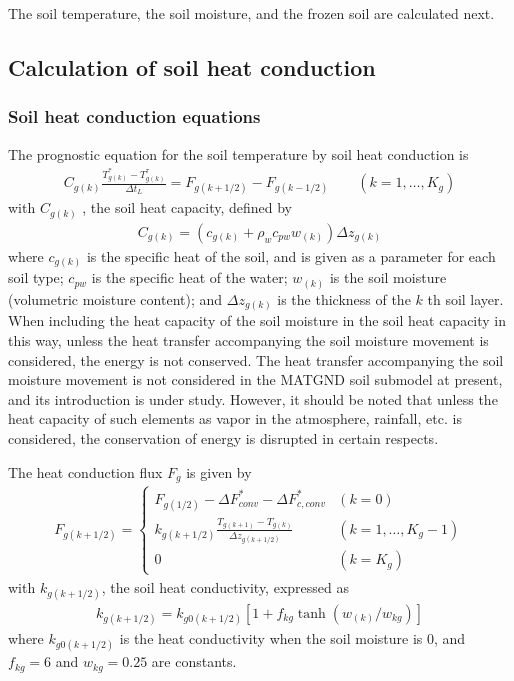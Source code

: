 The soil temperature, the soil moisture, and the frozen soil are calculated next.

\subsection{Calculation of soil heat conduction}\label{calculation-of-soil-heat-conduction}

\subsubsection{Soil heat conduction equations}\label{soil-heat-conduction-equations}

The prognostic equation for the soil temperature by soil heat conduction is \begin{eqnarray}
C_{g(k)} \frac{T_{g(k)}^\ast - T_{g(k)}^{\tau}}{\Delta t_L} = F_{g(k+1/2)} - F_{g(k-1/2)}
\qquad (k=1,\ldots,K_{g}) \label{eq289}
\end{eqnarray} with \(C_{g(k)}\) , the soil heat capacity, defined by \begin{eqnarray}
 C_{g(k)} = ( c_{g(k)} + \rho_w c_{pw} w_{(k)} ) \Delta z_{g(k)}
\end{eqnarray} where \(c_{g(k)}\) is the specific heat of the soil, and is given as a parameter for each soil type; \(c_{pw}\) is the specific heat of the water; \(w_{(k)}\) is the soil moisture (volumetric
moisture content); and \(\Delta z_{g(k)}\) is the thickness of the \(k\) th soil layer. When including the heat capacity of the soil moisture in the soil heat capacity in this way, unless the heat
transfer accompanying the soil moisture movement is considered, the energy is not conserved. The heat transfer accompanying the soil moisture movement is not considered in the MATGND soil submodel at
present, and its introduction is under study. However, it should be noted that unless the heat capacity of such elements as vapor in the atmosphere, rainfall, etc. is considered, the conservation of
energy is disrupted in certain respects.

The heat conduction flux \(F_{g}\) is given by \begin{eqnarray}
 F_{g(k+1/2)} =
\left\{
\begin{array}{ll}
F_{g(1/2)} - \Delta F_{conv}^\ast - \Delta F_{c,conv}^\ast
 & (k=0)\\
\displaystyle{
k_{g(k+1/2)} \frac{T_{g(k+1)} - T_{g(k)}}{\Delta z_{g(k+1/2)}}
}
 & (k=1,\ldots,K_{g}-1) \\
\displaystyle{
0
}
 & (k=K_{g})
\end{array}
\right. \label{eq291}
\end{eqnarray} with \(k_{g(k+1/2)}\), the soil heat conductivity, expressed as \begin{eqnarray}
 k_{g(k+1/2)} = k_{g0(k+1/2)} [ 1 + f_{kg} \tanh( w_{(k)}/ w_{kg} ) ]
\end{eqnarray} where \(k_{g0(k+1/2)}\) is the heat conductivity when the soil moisture is 0, and \(f_{kg}=6\) and \(w_{kg}=0.25\) are constants.

